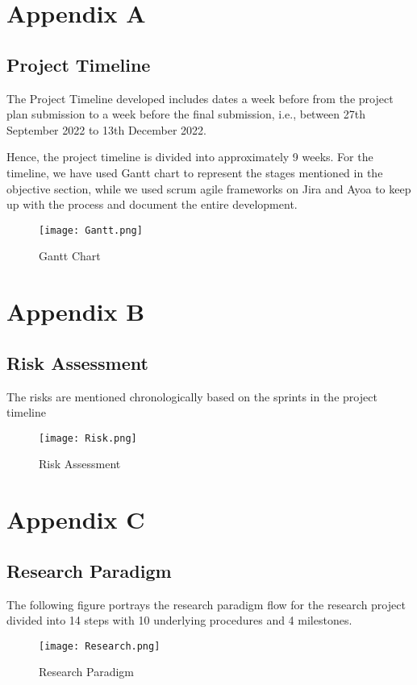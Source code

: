 \documentclass[11pt, a4paper]{article}
\begin{document}
\newpage 




\newpage

\section*{Appendix A}
\subsection*{Project Timeline}

The Project Timeline developed includes dates a week before from the project plan submission to a week before the final submission, i.e., between 27th September 2022 to 13th December 2022.

Hence, the project timeline is divided into approximately 9 weeks.\newline\newline
For the timeline, we have used Gantt chart to represent the stages mentioned in the objective section, while we used scrum agile frameworks on Jira and Ayoa to keep up with the process and document the entire development.

\begin{figure}[h]
    \center
    \texttt{[image: Gantt.png]}
    \caption{Gantt Chart}
    \label{fig:GanttChart}
\end{figure}


\newpage
\section*{Appendix B}
\subsection*{Risk Assessment}
The risks are mentioned chronologically based on the sprints in the project timeline

\begin{figure}[h]
    \center
    \texttt{[image: Risk.png]}
    \caption{Risk Assessment}
    \label{fig:Risk Assessment}
\end{figure}


\newpage
\section*{Appendix C}
\subsection*{Research Paradigm}
The following figure portrays the research paradigm flow for the research project divided into 14 steps with 10 underlying procedures and 4 milestones.

\begin{figure}[h]
    \center
    \texttt{[image: Research.png]}
    \caption{Research Paradigm}
    \label{fig:research paradigm}
\end{figure}
\end{document}
